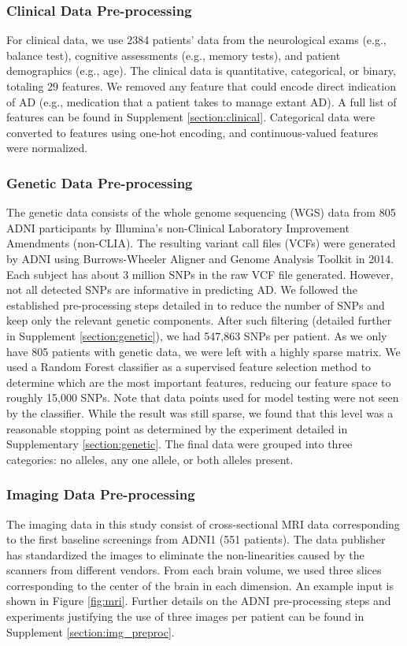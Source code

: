 \documentclass[11pt]{article}
\begin{document}
\subsubsection*{Clinical Data Pre-processing}
For clinical data, we use 2384 patients' data from the neurological exams (e.g., balance test), cognitive assessments (e.g., memory tests), and patient demographics (e.g., age). The clinical data is quantitative, categorical, or binary, totaling 29 features. We removed any feature that could encode direct indication of AD (e.g., medication that a patient takes to manage extant AD). A full list of features can be found in Supplement \ref{section:clinical}. Categorical data were converted to features using one-hot encoding, and continuous-valued features were normalized. 

\subsubsection*{Genetic Data Pre-processing}
\label{subsubsection:genetic_proc}
The genetic data consists of the whole genome sequencing (WGS) data from 805 ADNI participants by Illumina’s non-Clinical Laboratory Improvement Amendments (non-CLIA). The resulting variant call files (VCFs) were generated by ADNI using Burrows-Wheeler Aligner and Genome Analysis Toolkit in 2014. Each subject has about 3 million SNPs in the raw VCF file generated. However, not all detected SNPs are informative in predicting AD. We followed the established pre-processing steps detailed in \cite{venugopalan2021multimodal} to reduce the number of SNPs and keep only the relevant genetic components. After such filtering (detailed further in Supplement \ref{section:genetic}), we had 547,863 SNPs per patient. As we only have 805 patients with genetic data, we were left with a highly sparse matrix. We used a Random Forest classifier as a supervised feature selection method to determine which are the most important features, reducing our feature space to roughly 15,000 SNPs. Note that data points used for model testing were not seen by the classifier. While the result was still sparse, we found that this level was a reasonable stopping point as determined by the experiment detailed in Supplementary \ref{section:genetic}. The final data were grouped into three categories: no alleles, any one allele, or both alleles present.
    

\subsubsection*{Imaging Data Pre-processing}
The imaging data in this study consist of cross-sectional MRI data corresponding to the first baseline screenings from ADNI1 (551 patients). The data publisher has standardized the images to eliminate the non-linearities caused by the scanners from different vendors. From each brain volume, we used three slices corresponding to the center of the brain in each dimension. An example input is shown in Figure \ref{fig:mri}. Further details on the ADNI pre-processing steps and experiments justifying the use of three images per patient can be found in Supplement \ref{section:img_preproc}.
\end{document}
